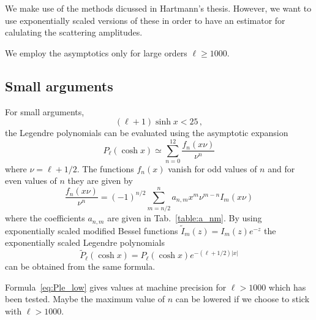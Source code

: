 \documentclass[onecolumn%
              ,superscriptaddress%
              ,aps%
              ,pra]{revtex4}
\begin{document}
We make use of the methods dicussed in Hartmann's thesis.
However, we want to use exponentially scaled versions of these
in order to have an estimator for calulating the scattering amplitudes.

We employ the asymptotics only for large orders $\ell\geq 1000$.

\subsection{Small arguments}
For small arguments,
\begin{equation}
(\ell+1)\sinh x < 25\,,
\end{equation}
the Legendre polynomials can be evaluated using the asymptotic expansion
\begin{equation}\label{eq:Ple_low}
P_\ell(\cosh x) \simeq \sum_{n=0}^{12} \frac{f_n(x\nu)}{\nu^n}
\end{equation}
where $\nu=\ell+1/2$. The functions $f_n(x)$ vanish for odd values of $n$
and for even values of $n$ they are given by
\begin{equation}
\frac{f_n(x\nu)}{\nu^n} = (-1)^{n/2}\sum_{m=n/2}^{n} a_{n,m} x^m \nu^{m-n} I_m(x\nu)
\end{equation}
where the coefficients $a_{n,m}$ are given in Tab.~\ref{table:a_nm}. By using exponentially scaled modified Bessel functions $\tilde I_m(z) = I_m(z) e^{-z}$ the exponentially scaled Legendre polynomials
\begin{equation}
\tilde P_\ell(\cosh x) = P_\ell(\cosh x) e^{-(\ell+1/2)\vert x\vert}
\end{equation}
can be obtained from the same formula.

Formula~\eqref{eq:Ple_low} gives values at machine precision for $\ell > 1000$ which has been tested. Maybe the maximum value of $n$ can be lowered if we choose to stick with $\ell>1000$.
\end{document}
